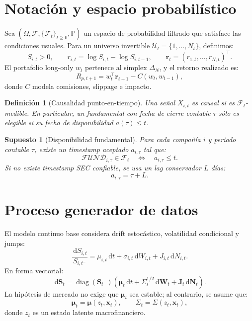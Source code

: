\documentclass[11pt,letterpaper]{article}
\newtheorem{definition}{Definición}
\newtheorem{assumption}{Supuesto}
\DeclareMathOperator{\diag}{diag}
\newcommand{\Prob}{\mathbb{P}}
\newcommand{\F}{\mathcal{F}}
\newcommand{\1}{\mathbf{1}}
\newcommand{\dd}{\,\mathrm{d}}
\begin{document}
\section{Notación y espacio probabilístico}

Sea \((\Omega,\F,\{\F_t\}_{t\geq 0},\Prob)\) un espacio de probabilidad filtrado que satisface las condiciones usuales. Para un universo invertible \(\mathcal{U}_t=\{1,\ldots,N_t\}\), definimos:
\[
    S_{i,t}>0,\qquad
    r_{i,t} = \log S_{i,t} - \log S_{i,t-1},
    \qquad
    \bm r_t = (r_{1,t},\ldots,r_{N,t})^\top .
\]
El portafolio long-only \(w_t\) pertenece al simplex \(\Delta_N\), y el retorno realizado es:
\[
    R_{p,t+1} = w_t^\top \bm r_{t+1} - C(w_t,w_{t-1}),
\]
donde \(C\) modela comisiones, slippage e impacto.

\begin{definition}[Causalidad punto-en-tiempo]
Una señal \(X_{i,t}\) es causal si es \(\F_t\)-medible. En particular, un fundamental con fecha de cierre contable \(\tau\) sólo es elegible si su fecha de disponibilidad \(a(\tau)\le t\).
\end{definition}

\begin{assumption}[Disponibilidad fundamental]
Para cada compañía \(i\) y periodo contable \(\tau\), existe un timestamp aceptado \(a_{i,\tau}\) tal que:
\[
    \mathcal{FUND}_{i,\tau} \in \F_t
    \quad \Longleftrightarrow \quad
    a_{i,\tau}\le t.
\]
Si no existe timestamp SEC confiable, se usa un lag conservador \(L\) días:
\[
    a_{i,\tau} = \tau + L.
\]
\end{assumption}

\section{Proceso generador de datos}

El modelo continuo base considera drift estocástico, volatilidad condicional y jumps:
\[
    \frac{\dd S_{i,t}}{S_{i,t^-}}
    =
    \mu_{i,t}\dd t
    +
    \sigma_{i,t}\dd W_{i,t}
    +
    J_{i,t}\dd N_{i,t}.
\]
En forma vectorial:
\[
    \dd \bm S_t
    =
    \diag(\bm S_{t^-})
    \left(
        \bm\mu_t\dd t
        +
        \Sigma_t^{1/2}\dd \bm W_t
        +
        \bm J_t\dd \bm N_t
    \right).
\]
La hipótesis de mercado no exige que \(\bm\mu_t\) sea estable; al contrario, se asume que:
\[
    \bm\mu_t = \bm\mu(z_t,\bm x_t), \qquad
    \Sigma_t = \Sigma(z_t,\bm x_t),
\]
donde \(z_t\) es un estado latente macrofinanciero.
\end{document}

